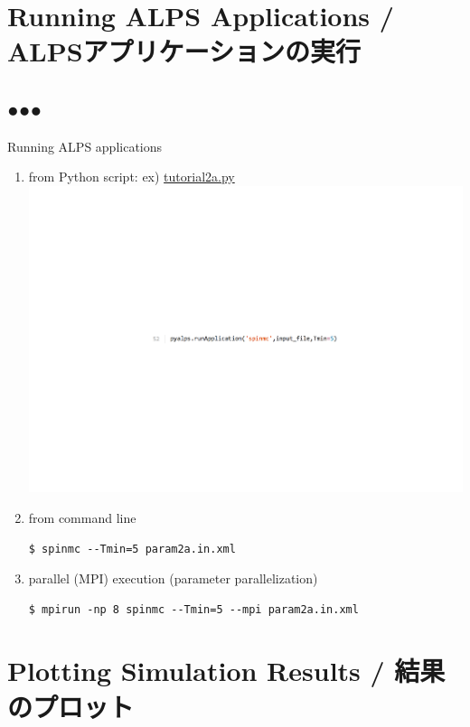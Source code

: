 \section{Running ALPS Applications / ALPSアプリケーションの実行}
\subsection*{{\protect\color{red}●}{\protect\color{blue}●}{\protect\color{green}●}}

\begin{frame}[t,fragile]{Running ALPS applications}
  \begin{enumerate}
  \item from Python script: ex) \href{https://github.com/cmsi/alps-tutorial/blob/tutorials/tutorials/mc-02-susceptibilities/tutorial2a.py}{tutorial2a.py}
    \includegraphics[height=.08\textheight]{tutorial2a-2.pdf}
  \item from command line
\begin{lstlisting}
$ spinmc --Tmin=5 param2a.in.xml
\end{lstlisting}
  \item parallel (MPI) execution (parameter parallelization)
\begin{lstlisting}
$ mpirun -np 8 spinmc --Tmin=5 --mpi param2a.in.xml
\end{lstlisting}
  \end{enumerate}
\end{frame}

\section{Plotting Simulation Results / 結果のプロット}
